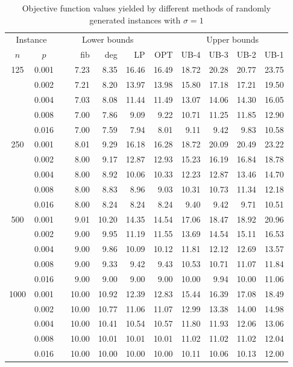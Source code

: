 \begin{table}[]
\centering
\begin{tabular}{cccrrrrrrrr}
	\multicolumn{2}{c}{Instance}&  &\multicolumn{3}{c}{Lower bounds} & &\multicolumn{4}{c}{Upper bounds} \\
\cline{1-2}\cline{4-6}\cline{8-11}
	$n$ & $p$ & & fib  & deg  & LP & OPT & UB-4  & UB-3  & UB-2  & UB-1  \\
\hline
\multirow{5}{*}{125} 
& 0.001 && 7.23 & 8.35 & 16.46 & 16.49 & 18.72 & 20.28 & 20.77 & 23.75 \\
& 0.002 && 7.21 & 8.20 & 13.97 & 13.98 & 15.80 & 17.18 & 17.21 & 19.50 \\
& 0.004 && 7.03 & 8.08 & 11.44 & 11.49 & 13.07 & 14.06 & 14.30 & 16.05 \\
& 0.008 && 7.00 & 7.86 & 9.09  & 9.22  & 10.71 & 11.25 & 11.85 & 12.90 \\
& 0.016 && 7.00 & 7.59 & 7.94  & 8.01  & 9.11  & 9.42  & 9.83  & 10.58 \\
\hline
\multirow{5}{*}{250} 
& 0.001 && 8.01 & 9.29 & 16.18 & 16.28 & 18.72 & 20.09 & 20.49 & 23.22 \\
& 0.002 && 8.00 & 9.17 & 12.87 & 12.93 & 15.23 & 16.19 & 16.84 & 18.78 \\
& 0.004 && 8.00 & 8.92 & 10.06 & 10.33 & 12.23 & 12.87 & 13.46 & 14.70 \\
& 0.008 && 8.00 & 8.83 & 8.96  & 9.03  & 10.31 & 10.73 & 11.34 & 12.18 \\
& 0.016 && 8.00 & 8.24 & 8.24  & 8.24  & 9.40  & 9.42  & 9.71  & 10.51 \\
\hline
\multirow{5}{*}{500} 
& 0.001 && 9.01 & 10.20 & 14.35 & 14.54 & 17.06 & 18.47 & 18.92 & 20.96 \\
& 0.002 && 9.00 & 9.95  & 11.19 & 11.55 & 13.69 & 14.54 & 15.11 & 16.53 \\
& 0.004 && 9.00 & 9.86  & 10.09 & 10.12 & 11.81 & 12.12 & 12.69 & 13.57 \\
& 0.008 && 9.00 & 9.33  & 9.42  & 9.43  & 10.53 & 10.71 & 11.07 & 11.84 \\
& 0.016 && 9.00 & 9.00  & 9.00  & 9.00  & 10.00 & 9.94  & 10.00 & 11.06 \\
\hline
\multirow{5}{*}{1000} 
& 0.001 && 10.00 & 10.92 & 12.39 & 12.83 & 15.44 & 16.39 & 17.08 & 18.49 \\
& 0.002 && 10.00 & 10.77 & 11.06 & 11.07 & 12.99 & 13.38 & 14.00 & 14.98 \\
& 0.004 && 10.00 & 10.41 & 10.54 & 10.57 & 11.80 & 11.93 & 12.06 & 13.06 \\
& 0.008 && 10.00 & 10.01 & 10.01 & 10.01 & 11.02 & 11.02 & 11.02 & 12.04 \\
& 0.016 && 10.00 & 10.00 & 10.00 & 10.00 & 10.11 & 10.06 & 10.13 & 12.00 \\
\end{tabular}                              
\caption{Objective function values yielded by different methods of randomly generated instances with $\sigma=1$}
\label{tab:obj-s1}
\end{table}

